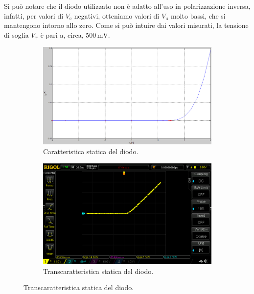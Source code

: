 \documentclass[a4paper]{article}
\begin{document}
				Si può notare che il diodo utilizzato non è adatto all'uso in polarizzazione inversa, infatti, per valori di $ V_{\mathrm{e}} $ negativi, otteniamo valori di $ V_{\mathrm{u}} $ molto bassi, che si mantengono intorno allo zero. Come si può intuire dai valori misurati, la tensione di soglia $ V_{\mathrm{\gamma}} $ è pari a, circa, $ 500 \, \mathrm{mV} $.
				\begin{figure}[h!]
					\centering
					\begin{subfigure}{0.4\textwidth}
						\centering
						\includegraphics[scale=0.3]{caratteristicheStaticheDiodoCaratteristica}
						\caption{Caratteristica statica del diodo.}
					\end{subfigure}
					\begin{subfigure}{0.4\textwidth}
						\centering
						\includegraphics[scale=0.5]{caratteristicheStaticheDiodoTranscaratteristica}
						\caption{Transcaratteristica statica del diodo.}
					\end{subfigure}
					\label{fig:caratteristicheStaticheDiodo}
				\end{figure}
\end{document}
